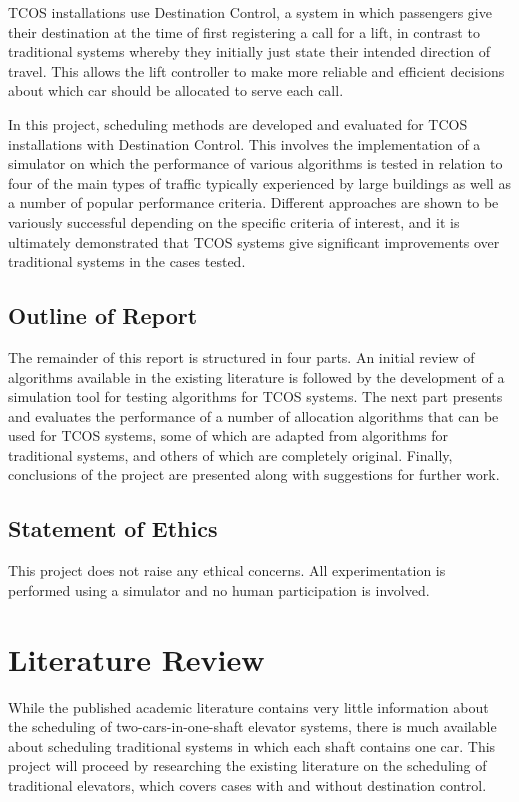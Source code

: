 \documentclass{UoYCSproject}
\begin{document}
TCOS installations use Destination Control, a system in which passengers give their destination at the time of first registering a call for a lift, in contrast to traditional systems whereby they initially just state their intended direction of travel.  This allows the lift controller to make more reliable and efficient decisions about which car should be allocated to serve each call.

In this project, scheduling methods are developed and evaluated for TCOS installations with Destination Control.  This involves the implementation of a simulator on which the performance of various algorithms is tested in relation to four of the main types of traffic typically experienced by large buildings as well as a number of popular performance criteria.  Different approaches are shown to be variously successful depending on the specific criteria of interest, and it is ultimately demonstrated that TCOS systems give significant improvements over traditional systems in the cases tested.

\section{Outline of Report}

The remainder of this report is structured in four parts.  An initial review of algorithms available in the existing literature is followed by the development of a simulation tool for testing algorithms for TCOS systems.  The next part presents and evaluates the performance of a number of allocation algorithms that can be used for TCOS systems, some of which are adapted from algorithms for traditional systems, and others of which are completely original.  Finally, conclusions of the project are presented along with suggestions for further work.

\section{Statement of Ethics}

This project does not raise any ethical concerns.  All experimentation is performed using a simulator and no human participation is involved.

\chapter{Literature Review}

While the published academic literature contains very little information about the scheduling of two-cars-in-one-shaft elevator systems, there is much available about scheduling traditional systems in which each shaft contains one car.  This project will proceed by researching the existing literature on the scheduling of traditional elevators, which covers cases with and without destination control.
\end{document}
